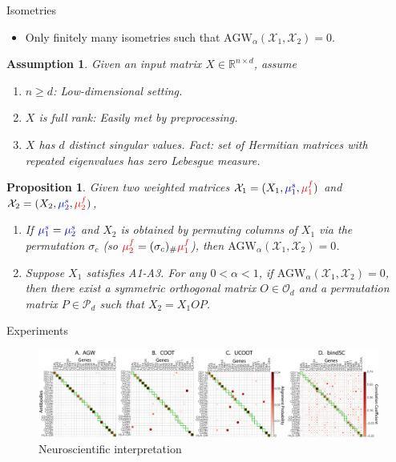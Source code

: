 \documentclass{beamer}
\newcommand{\agw}{\text{AGW}}
\newcommand{\cX}{\mathcal X}
\newcommand{\bbR}{\mathbb R}
\newcommand{\mfsrc}{{\color{red}{\mu_1^f}}}
\newcommand{\mftg}{{\color{red}{\mu_2^f}}}
\newcommand{\mssrc}{{\color{blue}{\mu_1^s}}}
\newcommand{\mstg}{{\color{blue}{\mu_2^s}}}
\newtheorem{proposition}{Proposition}[section]
\newtheorem{assumption}{Assumption}
\begin{document}
\begin{frame}{Isometries}
\tiny
\vspace{-0.2cm}
\begin{itemize}
  \item Only finitely many isometries such that $\agw_{\alpha}(\cX_1, \cX_2) = 0$.
\end{itemize}
\begin{assumption}
  \label{assumption:1}
Given an input matrix $X \in \bbR^{n \times d}$, assume
\begin{enumerate}
  \item[(A1)] $n \geq d$: Low-dimensional setting.
  \item[(A2)] $X$ is full rank: Easily met by preprocessing.
  \item[(A3)] $X$ has $d$ distinct singular values. Fact:
  set of Hermitian matrices with repeated eigenvalues has zero Lebesgue measure.
\end{enumerate}
\end{assumption}
\begin{proposition}
  Given two weighted matrices $\cX_1 = (X_1, \mssrc, \mfsrc)$
  and $\cX_2 = (X_2, \mstg, \mftg)$,
  \begin{enumerate}
      \item[$(\Rightarrow)$] If $\mssrc = \mstg$ and
      $X_2$ is obtained by permuting columns of $X_1$ via
      the permutation $\sigma_c$ (so $\mftg = (\sigma_c)_{\#} \mfsrc$),
      then $\agw_{\alpha}(\cX_1, \cX_2) = 0$.
      \item[$(\Leftarrow)$] Suppose $X_1$ satisfies A1-A3. For any $0 < \alpha < 1$,
      if $\agw_{\alpha}(\cX_1, \cX_2) = 0$,
      then there exist a symmetric orthogonal matrix $O \in \mathcal O_d$
      and a permutation matrix $P \in \mathcal P_d$ such that $X_2 = X_1 OP$.
  \end{enumerate}
\end{proposition}
\end{frame}

\begin{frame}{Experiments}
\tiny
\begin{figure}
  \centering
  \includegraphics[width=1.\linewidth, keepaspectratio=true]{OT_new/cite_fgcoot_final.pdf}
  \caption*{Neuroscientific interpretation}
\end{figure}
\end{frame}
\end{document}
